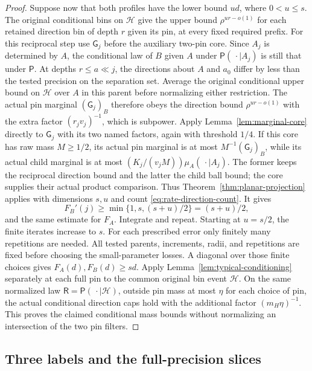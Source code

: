 \begin{proof}
Suppose now that both profiles have the lower bound $ud$, where
$0<u\le s$.  The original conditional bins on $\mathcal H$ give the
upper bound $\rho^{ur-o(1)}$ for each retained direction bin of depth
$r$ given its pin, at every fixed required prefix.
For this reciprocal step use $\mathsf G_j$ before the auxiliary
two-pin core.  Since $A_j$ is determined by $A$, the conditional law
of $B$ given $A$ under $\mathsf P(\,\cdot\mid A_j)$ is still that under
$\mathsf P$.  At depths $r\le a\ll j$, the directions about $A$ and
$a_0$ differ by less than the tested precision on the separation set.
Average the original conditional upper bound on $\mathcal H$ over
$A$ in this parent before normalizing either restriction.  The actual
pin marginal $(\mathsf G_j)_B$ therefore obeys the direction bound
$\rho^{ur-o(1)}$ with the extra factor $(r_jv_j)^{-1}$, which is
subpower.  Apply Lemma~\ref{lem:marginal-core} directly to
$\mathsf G_j$ with its two named factors, again with threshold $1/4$.
If this core has raw mass $M\ge1/2$, its actual pin marginal is at most
$M^{-1}(\mathsf G_j)_B$, while its actual child marginal is at most
$(K_j/(v_jM))\mu_A(\,\cdot\mid A_j)$.  The former keeps the reciprocal
direction bound and the latter the child ball bound; the core supplies
their actual product comparison.  Thus
Theorem~\ref{thm:planar-projection} applies with dimensions $s,u$ and
count \eqref{eq:rate-direction-count}.  It gives
\[
 F_B'(j)\ge\min\{1,s,(s+u)/2\}=(s+u)/2,
\]
and the same estimate for $F_A$. Integrate and repeat. Starting at
$u=s/2$, the finite iterates increase to $s$. For each prescribed
error only finitely many repetitions are needed. All tested parents,
increments, radii, and repetitions are fixed before choosing the
small-parameter losses. A diagonal over those finite choices gives
$F_A(d),F_B(d)\ge sd$.  Apply
Lemma~\ref{lem:typical-conditioning} separately at each full pin to
the common original bin event $\mathcal H$.  On the same normalized
law $\mathsf R=\mathsf P(\,\cdot\mid\mathcal H)$, outside pin mass
at most $\eta$ for each choice of pin, the actual conditional direction
caps hold with the additional factor $(m_H\eta)^{-1}$.  This proves
the claimed conditional mass bounds without normalizing an intersection
of the two pin filters.
\end{proof}

\subsection{Three labels and the full-precision slices}

